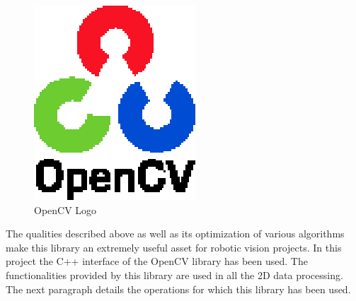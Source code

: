 	\begin{figure}[h]
		\begin{center}
	    \includegraphics[scale=1]{img/opencv/logo.eps}
		\caption[OpenCV Logo]{OpenCV Logo}
		\label{opencv_logo}
		\end{center}
	\end{figure}

	The qualities described above as well as its optimization of various algorithms make this library an extremely useful asset for robotic vision projects. 
	In this project the C++ interface of the OpenCV library has been used. 
	The functionalities provided by this library are used in all the 2D data processing. 
	The next paragraph details the operations for which this library has been used. 

